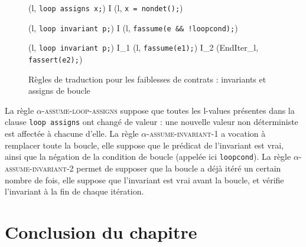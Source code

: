 \begin{figure}[bt]
  \scriptsize{
    {
      {(l, \mbox{\lstinline'loop assigns x;'})
        I \concat (l, \mbox{\lstinline'x = nondet();'})}
    }

    {
      {
        (l, \mbox{\lstinline'loop invariant p;'}) 
        I \concat (l, \mbox{\lstinline'fassume(e && !loopcond);'})
      }
    }

    {
      {
        (l, \mbox{\lstinline'loop invariant p;'}) 
        I_1 \concat (l, \mbox{\lstinline'fassume(e1);'})
        \concat I_2 \concat (EndIter_l, \mbox{\lstinline'fassert(e2);'})
      }
    }
  }
  \caption{Règles de traduction pour les faiblesses de contrats :
    invariants et assigns de boucle}
  \label{fig:assume-loop-annot}
\end{figure}

La règle \textsc{$\alpha$-assume-loop-assigns} suppose que toutes les l-values
présentes dans la clause \lstinline'loop assigns' ont changé de valeur : une
nouvelle valeur non déterministe est affectée à chacune d'elle.
La règle \textsc{$\alpha$-assume-invariant-1} a vocation à remplacer toute la
boucle, elle suppose que le prédicat de l'invariant est vrai, ainsi que la
négation de la condition de boucle (appelée ici \lstinline'loopcond').
La règle \textsc{$\alpha$-assume-invariant-2} permet de supposer que la boucle
a déjà itéré un certain nombre de fois, elle suppose que l'invariant est vrai
avant la boucle, et vérifie l'invariant à la fin de chaque itération.


\section*{Conclusion du chapitre}

